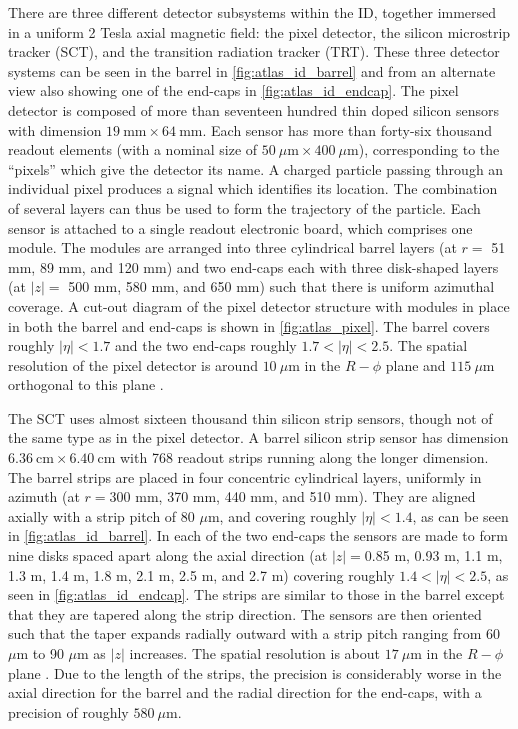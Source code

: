 There are three different detector subsystems within the ID, together
immersed in a uniform 2 Tesla axial magnetic field: the pixel detector,
the silicon microstrip tracker (SCT), and the transition radiation
tracker (TRT). These three detector systems can be seen 
in the barrel in \fig\ref{fig:atlas_id_barrel} and from an alternate
view also showing one of the end-caps in \fig\ref{fig:atlas_id_endcap}. 
The pixel detector
is composed of more than seventeen hundred thin doped silicon sensors with 
dimension $19~\textrm{mm} \times 64~\textrm{mm}$. Each sensor has more than forty-six
thousand readout elements (with a 
nominal size of $50 ~\mu\textrm{m} \times 400~\mu\textrm{m}$),
corresponding to the ``pixels'' which give the detector its name. 
A charged particle passing through an individual pixel produces a signal
which identifies its location. The combination of 
several layers can thus be used to form the trajectory of the particle. %
Each sensor is attached to a single readout electronic board, which comprises
one module.
The modules are arranged into three cylindrical barrel layers (at 
$r = $ 51 mm, 89 mm, and 120 mm)  and 
two end-caps each with three disk-shaped layers (at $|z| = $ 500 mm, 580 mm, 
and 650 mm) such that there is uniform
azimuthal coverage. A cut-out diagram of the pixel detector 
structure with modules in place in both the barrel and end-caps is shown 
in \fig\ref{fig:atlas_pixel}. The barrel covers roughly 
$|\eta|<1.7$ and the two end-caps roughly $1.7<|\eta|<2.5$.
The 
spatial resolution of the pixel detector is around $10~\mu\textrm{m}$ in 
the $R-\phi$ plane and $115 ~\mu\textrm{m}$ 
orthogonal to this plane \cite{ATLAS-CONF-2014-047}.



The SCT uses almost sixteen thousand thin silicon strip sensors, though not of the 
same type as in the pixel detector. 
A barrel silicon strip sensor 
has dimension $6.36~\textrm{cm} \times 6.40~\textrm{cm}$
with 768 readout strips running along the longer dimension. The barrel
strips are placed in four concentric cylindrical layers, uniformly in azimuth
(at $r = $300 mm, 370 mm, 440 mm, and 510 mm).
They are aligned axially with a strip pitch of 
80 $\mu$m, and covering roughly
$|\eta|<1.4$, as can be seen in \fig\ref{fig:atlas_id_barrel}.
In each of the two end-caps the sensors are made to form nine
disks spaced apart along the axial 
direction (at $|z| = $0.85 m, 0.93 m, 1.1 m, 1.3 m, 1.4 m, 
1.8 m, 2.1 m, 2.5 m, and 2.7 m) covering roughly $1.4 < |\eta|<2.5$, 
as seen in \fig\ref{fig:atlas_id_endcap}. The strips are similar
to those in the barrel except that they are tapered along the strip direction.
The sensors are then oriented such that the taper expands radially outward
with a strip pitch ranging from 60 $\mu$m to 90 $\mu$m as $|z|$ increases.
The spatial resolution is about $17~\mu\textrm{m}$
in the $R-\phi$ plane \cite{ATLAS-CONF-2014-047}. 
Due to the length of the strips, the precision is considerably
worse in the axial direction for the barrel and the radial direction for 
the end-caps, with a precision of roughly $580~\mu\textrm{m}$.


